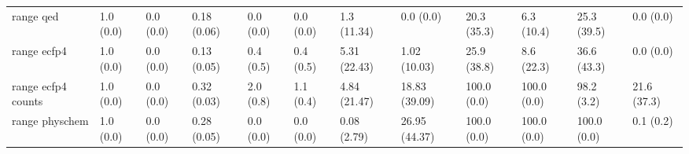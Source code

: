 \begin{tabular}{llllllllllll}
range qed & {\cellcolor[HTML]{F6FCFD}} \color[HTML]{000000} 1.0 (0.0) & {\cellcolor[HTML]{F7FCFD}} \color[HTML]{000000} 0.0 (0.0) & {\cellcolor[HTML]{6AC4A7}} \color[HTML]{000000} 0.18 (0.06) & {\cellcolor[HTML]{F7FCFD}} \color[HTML]{000000} 0.0 (0.0) & {\cellcolor[HTML]{F7FCFD}} \color[HTML]{000000} 0.0 (0.0) & {\cellcolor[HTML]{F5FBFD}} \color[HTML]{000000} 1.3 (11.34) & {\cellcolor[HTML]{F7FCFD}} \color[HTML]{000000} 0.0 (0.0) & {\cellcolor[HTML]{F6FCFD}} \color[HTML]{000000} 20.3 (35.3) & {\cellcolor[HTML]{EFF9FB}} \color[HTML]{000000} 6.3 (10.4) & {\cellcolor[HTML]{39A569}} \color[HTML]{F1F1F1} 25.3 (39.5) & {\cellcolor[HTML]{F7FCFD}} \color[HTML]{000000} 0.0 (0.0) \\
range ecfp4 & {\cellcolor[HTML]{F6FCFD}} \color[HTML]{000000} 1.0 (0.0) & {\cellcolor[HTML]{F7FCFD}} \color[HTML]{000000} 0.0 (0.0) & {\cellcolor[HTML]{94D6C5}} \color[HTML]{000000} 0.13 (0.05) & {\cellcolor[HTML]{F7FCFD}} \color[HTML]{000000} 0.4 (0.5) & {\cellcolor[HTML]{F7FCFD}} \color[HTML]{000000} 0.4 (0.5) & {\cellcolor[HTML]{F0F9FB}} \color[HTML]{000000} 5.31 (22.43) & {\cellcolor[HTML]{F6FCFD}} \color[HTML]{000000} 1.02 (10.03) & {\cellcolor[HTML]{F6FCFD}} \color[HTML]{000000} 25.9 (38.8) & {\cellcolor[HTML]{E5F5F9}} \color[HTML]{000000} 8.6 (22.3) & {\cellcolor[HTML]{00471C}} \color[HTML]{F1F1F1} 36.6 (43.3) & {\cellcolor[HTML]{157F3B}} \color[HTML]{F1F1F1} 0.0 (0.0) \\
range ecfp4 counts & {\cellcolor[HTML]{F6FCFD}} \color[HTML]{000000} 1.0 (0.0) & {\cellcolor[HTML]{F7FCFD}} \color[HTML]{000000} 0.0 (0.0) & {\cellcolor[HTML]{98D8C9}} \color[HTML]{000000} 0.32 (0.03) & {\cellcolor[HTML]{F7FCFD}} \color[HTML]{000000} 2.0 (0.8) & {\cellcolor[HTML]{F7FCFD}} \color[HTML]{000000} 1.1 (0.4) & {\cellcolor[HTML]{F0F9FB}} \color[HTML]{000000} 4.84 (21.47) & {\cellcolor[HTML]{D8F0EF}} \color[HTML]{000000} 18.83 (39.09) & {\cellcolor[HTML]{9FDACC}} \color[HTML]{000000} 100.0 (0.0) & {\cellcolor[HTML]{00471C}} \color[HTML]{F1F1F1} 100.0 (0.0) & {\cellcolor[HTML]{00441B}} \color[HTML]{F1F1F1} 98.2 (3.2) & {\cellcolor[HTML]{067230}} \color[HTML]{F1F1F1} 21.6 (37.3) \\
range physchem & {\cellcolor[HTML]{F6FCFD}} \color[HTML]{000000} 1.0 (0.0) & {\cellcolor[HTML]{F7FCFD}} \color[HTML]{000000} 0.0 (0.0) & {\cellcolor[HTML]{6AC4A7}} \color[HTML]{000000} 0.28 (0.05) & {\cellcolor[HTML]{F7FCFD}} \color[HTML]{000000} 0.0 (0.0) & {\cellcolor[HTML]{F7FCFD}} \color[HTML]{000000} 0.0 (0.0) & {\cellcolor[HTML]{F7FCFD}} \color[HTML]{000000} 0.08 (2.79) & {\cellcolor[HTML]{C4E9E1}} \color[HTML]{000000} 26.95 (44.37) & {\cellcolor[HTML]{00441B}} \color[HTML]{F1F1F1} 100.0 (0.0) & {\cellcolor[HTML]{00441B}} \color[HTML]{F1F1F1} 100.0 (0.0) & {\cellcolor[HTML]{00692A}} \color[HTML]{F1F1F1} 100.0 (0.0) & {\cellcolor[HTML]{F7FCFD}} \color[HTML]{000000} 0.1 (0.2) \\

\end{tabular}
